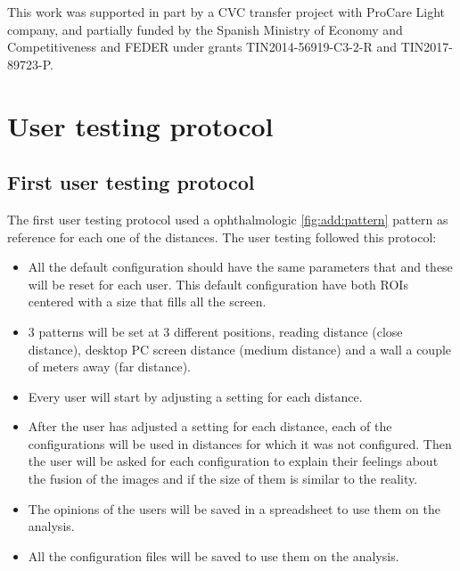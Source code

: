 \documentclass[10pt,a4paper,twocolumn,twoside]{article}
\begin{document}
	This work was supported in part by a CVC transfer project with ProCare Light company, and partially funded by the Spanish Ministry of Economy and Competitiveness and FEDER under grants TIN2014-56919-C3-2-R and TIN2017-89723-P.
	
	
	
	
	\appendix
	
	
	\section{User testing protocol}
	\subsection{First user testing protocol}
	\label{sec:annex:user1}
	The first user testing protocol used a ophthalmologic \ref{fig:add:pattern} pattern as reference for each one of the distances. The user testing followed this protocol: 
	
	\begin{itemize}
		\item All the default configuration should have the same parameters that and these will be reset for each user. This default configuration have both ROIs centered with a size that fills all the screen. 
		
		\item 3 patterns will be set at 3 different positions, reading distance (close distance), desktop PC screen distance (medium distance) and a wall a couple of meters away (far distance).
		
		\item Every user will start by adjusting a setting for each distance. 
		
		\item After the user has adjusted a setting for each distance, each of the configurations will be used in distances for which it was not configured. Then the user will be asked for each configuration to explain their feelings about the fusion of the images and if the size of them is similar to the reality.  
		
		\item The opinions of the users will be saved in a spreadsheet to use them on the analysis. 
		
		\item All the configuration files will be saved to use them on the analysis. 
	\end{itemize}
	
\end{document}
